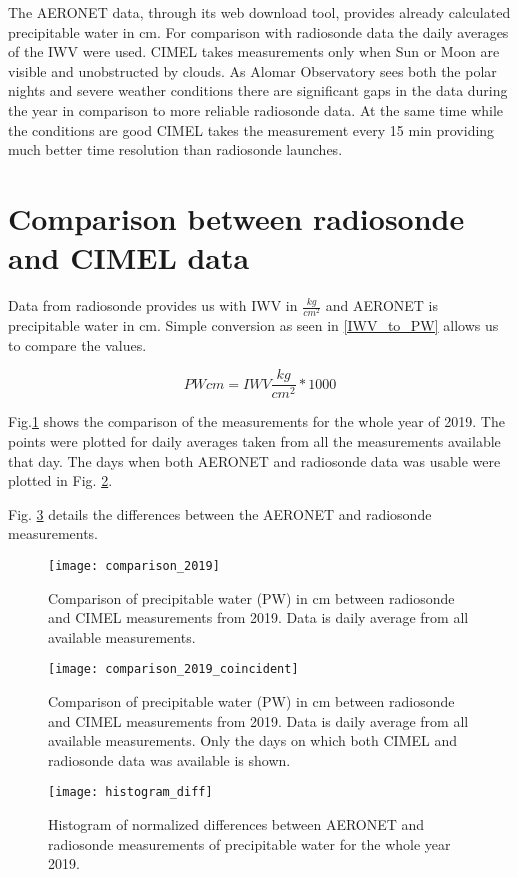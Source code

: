 \documentclass[]{book}
\begin{document}
	The AERONET data, through its web download tool, provides already calculated precipitable water in cm. For comparison with radiosonde data the daily averages of the IWV were used. CIMEL takes measurements only when Sun or Moon are visible and unobstructed by clouds. As Alomar Observatory sees both the polar nights and severe weather conditions there are significant gaps in the data during the year in comparison to more reliable radiosonde data. At the same time while the conditions are good CIMEL takes the measurement every 15 min providing much better time resolution than radiosonde launches.
	
	\section{Comparison between radiosonde and CIMEL data}
	
	Data from radiosonde provides us with IWV in $\frac{kg}{cm^2}$ and AERONET is precipitable water in cm. Simple conversion as seen in \ref{IWV_to_PW} allows us to compare the values.
	
	\begin{equation}
	\label{IWV_to_PW}
	PW cm = IWV \frac{kg}{cm^2} * 1000 
	\end{equation}
	
	Fig.\ref{fig: comparison} shows the comparison of the measurements for the whole year of 2019. The points were plotted for daily averages taken from all the measurements available that day. The days when both AERONET and radiosonde data was usable were plotted in Fig. \ref{fig: comparison_coincident}.
	
	Fig. \ref{fig: histogram} details the differences between the AERONET and radiosonde measurements.
	
	\begin{landscape}
		\begin{figure}
			\texttt{[image: comparison\_2019]}
			\caption{Comparison of precipitable water (PW) in cm between radiosonde and CIMEL measurements from 2019. Data is daily average from all available measurements.}
			\label{fig: comparison}
		\end{figure}
	
		\begin{figure}
			\texttt{[image: comparison\_2019\_coincident]}
			\caption{Comparison of precipitable water (PW) in cm between radiosonde and CIMEL measurements from 2019. Data is daily average from all available measurements. Only the days on which both CIMEL and radiosonde data was available is shown.}
			\label{fig: comparison_coincident}
		\end{figure}
		
		\begin{figure}
			\texttt{[image: histogram\_diff]}
			\caption{Histogram of normalized differences between AERONET and radiosonde measurements of precipitable water for the whole year 2019.}
			\label{fig: histogram}
		\end{figure}
	\end{landscape}
	
\end{document}
